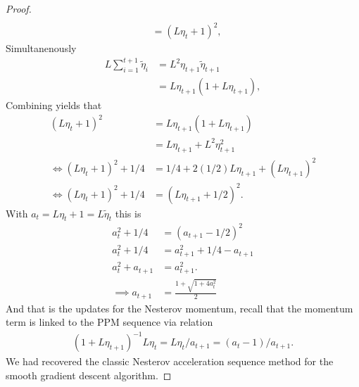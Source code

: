 \documentclass[12pt]{article}
\begin{document}
\begin{proof}
\begin{align*}
                \\
                &= (L\eta_t + 1)^2, 
            \end{align*}
            Simultanenously 
            \begin{align*}
                L \sum_{i = 1}^{t + 1} \tilde \eta_i 
                &= L^2 \eta_{t + 1} \tilde \eta_{t + 1}
                \\
                &= L \eta_{t + 1}(1+ L \eta_{t + 1}), 
            \end{align*}
            Combining yields that 
            \begin{align*}
                (L\eta_t + 1)^2 
                &= L\eta_{t + 1}(1 + L \eta_{t + 1})
                \\
                &= L\eta_{t + 1} + L^2 \eta_{t + 1}^2
                \\
                \iff 
                (L\eta_t + 1)^2 + 1/4 &= 
                1/4 + 2(1/2)L \eta_{t + 1} + (L \eta_{t + 1})^2
                \\
                \iff 
                (L\eta_t + 1)^2 + 1/4 &= 
                (L \eta_{t + 1} + 1/2)^2. 
            \end{align*}
            With $a_t = L\eta_t + 1 = L \tilde \eta_t$ this is 
            \begin{align*}
                a_t^2 + 1/4 &= (a_{t + 1} - 1/2)^2 
                \\
                a_t^2 + 1/4 &= a_{t + 1}^2 + 1/4 - a_{t + 1}
                \\
                a_t^2 + a_{t + 1} &= a_{t + 1}^2. 
                \\
                \implies 
                a_{t + 1} &= 
                \frac{1 + \sqrt{1 + 4a_t^2}}{2}
            \end{align*}
            And that is the updates for the Nesterov momentum, recall that the momentum term is linked to the PPM sequence via relation 
            \begin{align*}
                (1 + L \eta_{t+ 1})^{-1}L\eta_t = L\eta_t / a_{t + 1} = (a_t - 1)/a_{t + 1}. 
            \end{align*}
            We had recovered the classic Nesterov acceleration sequence method for the smooth gradient descent algorithm. 
        \end{proof}
\end{document}
